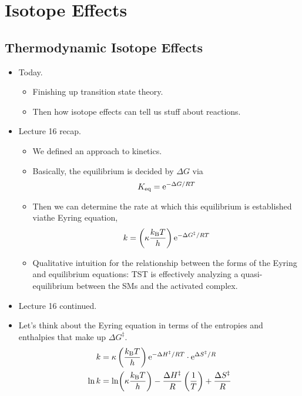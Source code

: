 \documentclass[../notes.tex]{subfiles}
\begin{document}
\chapter{Isotope Effects}
\section{Thermodynamic Isotope Effects}
\begin{itemize}
    \item {}Today.
    \begin{itemize}
        \item Finishing up transition state theory.
        \item Then how isotope effects can tell us stuff about reactions.
    \end{itemize}
    \item Lecture 16 recap.
    \begin{itemize}
        \item We defined an approach to kinetics.
        \item Basically, the  equilibrium is decided by $\Delta G$ via
        \begin{equation*}
            \Keq = \e[-\Delta G/RT]
        \end{equation*}
        \item Then we can determine the rate at which this equilibrium is established viathe Eyring equation,
        \begin{equation*}
            k = \left( \kappa\frac{\kB T}{h} \right)\e[-\Delta G^\ddagger/RT]
        \end{equation*}
        \item Qualitative intuition for the relationship between the forms of the Eyring and equilibrium equations: TST is effectively analyzing a quasi-equilibrium between the SMs and the activated complex.
    \end{itemize}
    \item Lecture 16 continued.
    \item Let's think about the Eyring equation in terms of the entropies and enthalpies that make up $\Delta G^\ddagger$.
    \begin{align*}
        k &= \kappa\left( \frac{\kB T}{h} \right)\e[-\Delta H^\ddagger/RT]\cdot\e[\Delta S^\ddagger/R]\\
        \ln k &= \ln(\kappa\frac{\kB T}{h})-\frac{\Delta H^\ddagger}{R}\left( \frac{1}{T} \right)+\frac{\Delta S^\ddagger}{R}\\

\end{align*}
\end{itemize}
\end{document}
